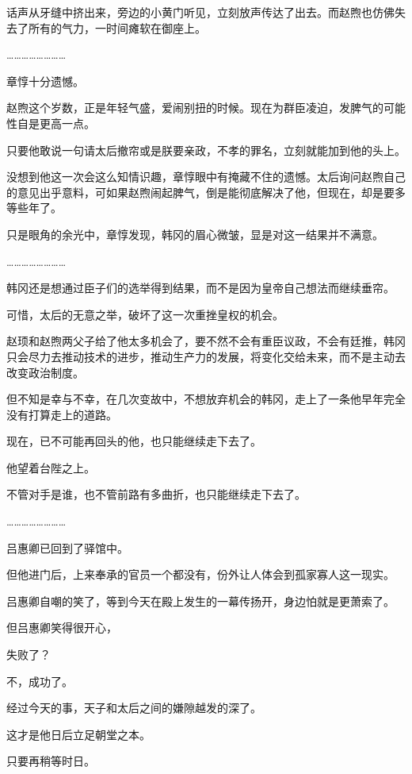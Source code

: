 话声从牙缝中挤出来，旁边的小黄门听见，立刻放声传达了出去。而赵煦也仿佛失去了所有的气力，一时间瘫软在御座上。

……………………

章惇十分遗憾。

赵煦这个岁数，正是年轻气盛，爱闹别扭的时候。现在为群臣凌迫，发脾气的可能性自是更高一点。

只要他敢说一句请太后撤帘或是朕要亲政，不孝的罪名，立刻就能加到他的头上。

没想到他这一次会这么知情识趣，章惇眼中有掩藏不住的遗憾。太后询问赵煦自己的意见出乎意料，可如果赵煦闹起脾气，倒是能彻底解决了他，但现在，却是要多等些年了。

只是眼角的余光中，章惇发现，韩冈的眉心微皱，显是对这一结果并不满意。

……………………

韩冈还是想通过臣子们的选举得到结果，而不是因为皇帝自己想法而继续垂帘。

可惜，太后的无意之举，破坏了这一次重挫皇权的机会。

赵顼和赵煦两父子给了他太多机会了，要不然不会有重臣议政，不会有廷推，韩冈只会尽力去推动技术的进步，推动生产力的发展，将变化交给未来，而不是主动去改变政治制度。

但不知是幸与不幸，在几次变故中，不想放弃机会的韩冈，走上了一条他早年完全没有打算走上的道路。

现在，已不可能再回头的他，也只能继续走下去了。

他望着台陛之上。

不管对手是谁，也不管前路有多曲折，也只能继续走下去了。

……………………

吕惠卿已回到了驿馆中。

但他进门后，上来奉承的官员一个都没有，份外让人体会到孤家寡人这一现实。

吕惠卿自嘲的笑了，等到今天在殿上发生的一幕传扬开，身边怕就是更萧索了。

但吕惠卿笑得很开心，

失败了？

不，成功了。

经过今天的事，天子和太后之间的嫌隙越发的深了。

这才是他日后立足朝堂之本。

只要再稍等时日。
